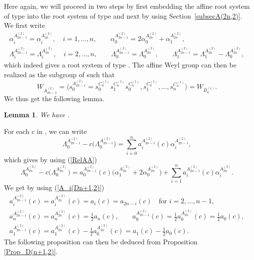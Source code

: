 \documentclass[10pt,a4paper]{amsart}
\newtheorem{Lemma}[Theorem]{Lemma}
\numberwithin{equation}{section}
\begin{document}
Here again, we will proceed in two steps by first embedding the affine root
system of type  into the root system of type 
and next by using Section~\ref{subsecA(2n,2)}. We first write%
\begin{gather}
\alpha _{i}^{A_{2n-1}^{(2)}}=\alpha _{i}^{A_{2n}^{(2)}},\quad i=1,\dots ,n, \qquad
\alpha _{0}^{A_{2n-1}^{(2)}}=2\alpha _{0}^{A_{2n}^{(2)}}+\alpha
_{1}^{A_{2n}^{(2)}},\nonumber\\
\Lambda _{i}^{A_{2n-1}^{(2)}}=\Lambda _{i}^{A_{2n}^{(2)}},\quad i=2,\dots ,n, \qquad
\Lambda _{0}^{A_{2n-1}^{(2)}}=\Lambda _{0}^{A_{2n}^{(2)}}, \qquad
\Lambda _{1}^{A_{2n-1}^{(2)}}=\Lambda _{1}^{A_{2n}^{(2)}}-\Lambda
_{0}^{A_{2n}^{(2)}},
 \label{RelAA}
\end{gather}
which indeed gives a root system of type . The affine Weyl
group  can then be realized as the subgroup of  such that
\begin{equation*}
W_{A_{2n-1}^{(2)}}=\bigl\langle
s_{0}^{A_{2n-1}^{(2)}}=s_{0}^{C_{n}^{(1)}}s_{1}^{C_{n}^{(1)}}s_{0}^{C_{n}^{(1)}},s_{1}^{C_{n}^{(1)}},\dots ,s_{n}^{C_{n}^{(1)}}\bigr\rangle =W_{B_{n}^{(1)}}.
\end{equation*}
We thus get the following lemma.

\begin{Lemma}
	We have .
\end{Lemma}

For each $c$ in , we can write%
\begin{equation*}
\Lambda _{0}^{A_{2n-1}^{(2)}}-c\bigl(\Lambda
_{0}^{A_{2n-1}^{(2)}}\bigr)=\sum_{i=0}^{n}a_{i}^{A_{2n-1}^{(2)}}(c)\alpha
_{i}^{A_{2n-1}^{(2)}},
\end{equation*}%
which gives by using (\ref{RelAA})%
\begin{equation*}
\Lambda _{0}^{A_{2n}^{(2)}}-c\bigl(\Lambda
_{0}^{A_{2n}^{(2)}}\bigr)=a_{0}^{A_{2n-1}^{(2)}}(c)\bigl(\alpha
_{1}^{A_{2n}^{(2)}}+2\alpha
_{0}^{A_{2n}^{(2)}}\bigr)+\sum_{i=1}^{n}a_{i}^{A_{2n-1}^{(2)}}(c)\alpha
_{i}^{A_{2n}^{(2)}} .
\end{equation*}%
We get by using (\ref{A_i(Dn+1,2)})
\begin{gather*}
a_{i}^{A_{2n-1}^{(2)}}(c)=a_{i}^{A_{2n}^{(2)}}(c)=a_{i}(c)=a_{2n-i}(c)\quad \text{for }i=2,\dots ,n-1 ,\\
a_{n}^{A_{2n-1}^{(2)}}(c)=a_{n}^{A_{2n}^{(2)}}(c)=\frac{1}{2}a_{n}(c) ,\qquad
a_{0}^{A_{2n-1}^{(2)}}(c)=\frac{1}{2}a_{0}^{A_{2n}^{(2)}}(c)=\frac{1}{2}
a_{0}(c),\\
a_{1}^{A_{2n-1}^{(2)}}(c)=a_{1}^{A_{2n}^{(2)}}(c)-\frac{1}{2}a_{0}^{A_{2n}^{(2)}}(c)=a_{1}(c)-\frac{1}{2}a_{0}(c).
\end{gather*}
The following proposition can then be deduced from Proposition \ref{Prop_D(n+1,2)}.
\end{document}
